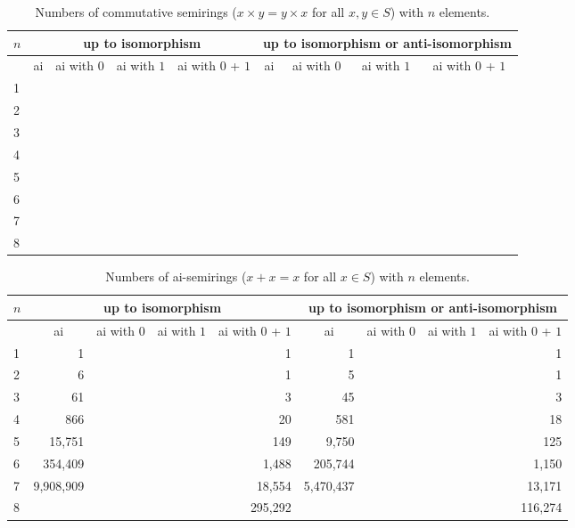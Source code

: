 \documentclass{article}
\theoremstyle{definition}
\theoremstyle{plain}
\begin{document}
\begin{table}[ht]
  \centering
  \begin{tabular}{l|r|r|r|r|r|r|r|r}
    $n$
    & \multicolumn{4}{c|}{up to isomorphism}
    & \multicolumn{4}{c}{up to isomorphism or anti-isomorphism} \\
    \midrule
    & \multicolumn{1}{c|}{ai} & \multicolumn{1}{c|}{ai with $0$}
    & \multicolumn{1}{c|}{ai with $1$} & \multicolumn{1}{c|}{ai with $0$ + $1$}
    & \multicolumn{1}{c|}{ai} & \multicolumn{1}{c|}{ai with $0$}
    & \multicolumn{1}{c|}{ai with $1$} & \multicolumn{1}{c|}{ai with $0$ + $1$}
    \\
    \midrule
    1 &              &          &&&          &       \\
    2 &              &          &&&          &       \\
    3 &             &         &&&          &       \\
    4 &            &        &&&         & \\
    5 &         &      &&&        & \\
    6 &        &    &&&      & \\
    7 &      &  &&&     & \\
    8 & & &&&    & \\
  \end{tabular}
  \caption{Numbers of commutative semirings ($x\times y = y \times
  x$ for all $x,y\in S$) with $n$ elements.}
  \label{tab:comm-semirings}
\end{table}

\begin{table}[ht]
  \centering
  \begin{tabular}{l|r|r|r|r|r|r|r|r}
    $n$
    & \multicolumn{4}{c|}{up to isomorphism}
    & \multicolumn{4}{c}{up to isomorphism or anti-isomorphism} \\
    \midrule
    & \multicolumn{1}{c|}{ai} & \multicolumn{1}{c|}{ai with $0$}
    & \multicolumn{1}{c|}{ai with $1$} & \multicolumn{1}{c|}{ai with $0$ + $1$}
    & \multicolumn{1}{c|}{ai} & \multicolumn{1}{c}{ai with $0$}
    & \multicolumn{1}{c|}{ai with $1$} & \multicolumn{1}{c|}{ai with $0$ + $1$}
    \\
    \midrule
    1 & 1             & &&1       & 1          & && 1      \\
    2 & 6             & &&1       & 5          & && 1      \\
    3 & 61            & &&3       & 45         & && 3      \\
    4 & 866           & &&20      & 581        & && 18     \\
    5 & 15,751        & &&149     & 9,750      & && 125    \\
    6 & 354,409       & &&1,488   & 205,744    & && 1,150  \\
    7 & 9,908,909     & &&18,554  & 5,470,437  & && 13,171 \\
    8 &               &           &&295,292 &  & && 116,274
  \end{tabular}
  \caption{Numbers of ai-semirings ($x + x = x$ for all $x\in S$) with $n$
  elements.}
  \label{tab:ai-semirings}
\end{table}
\end{document}
